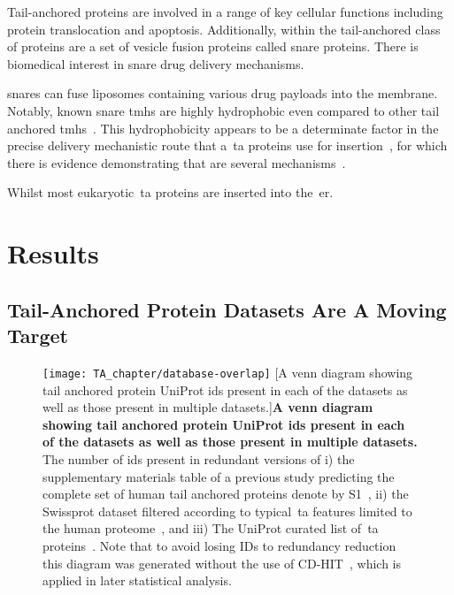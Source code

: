 Tail-anchored proteins are involved in a range of key cellular functions including protein translocation and apoptosis.
Additionally, within the tail-anchored class of proteins are a set of vesicle fusion proteins called \gls{snare} proteins.
There is biomedical interest in \gls{snare} drug delivery mechanisms.

\gls{snare}s can fuse liposomes containing various drug payloads into the membrane.
Notably, known \gls{snare} \gls{tmh}s are highly hydrophobic even compared to other tail anchored \gls{tmh}s~\cite{Kalbfleisch2007}.
This hydrophobicity appears to be a determinate factor in the precise delivery mechanistic route that a~\gls{ta} proteins use for insertion~\cite{Rabu2008, Rabu2009}, for which there is evidence demonstrating that are several mechanisms~\cite{Rabu2009, Johnson2013}.

Whilst most eukaryotic~\gls{ta} proteins are inserted into the~\gls{er}.

\section{Results}

\subsection{Tail-Anchored Protein Datasets Are A Moving Target}
\begin{figure}[!ht]
\centering
\texttt{[image: TA\_chapter/database-overlap]}
		[A venn diagram showing tail anchored protein UniProt ids present in each of the datasets as well as those present in multiple datasets.]{\textbf{A venn diagram showing tail anchored protein UniProt ids present in each of the datasets as well as those present in multiple datasets.}
The number of ids present in redundant versions of
i) the supplementary materials table of a previous study predicting the complete set of human tail anchored proteins denote by S1~\cite{Kalbfleisch2007},
ii) the Swissprot dataset filtered according to typical~\gls{ta} features limited to the human proteome~\cite{TheUniProtConsortium2014}, and
iii) The UniProt curated list of~\gls{ta} proteins~\cite{TheUniProtConsortium2014}.
Note that to avoid losing IDs to redundancy reduction this diagram was generated without the use of CD-HIT~\cite{Huang2010, Wu2011}, which is applied in later statistical analysis.}

\label{fig:tadatasetoverlap}
\end{figure}

